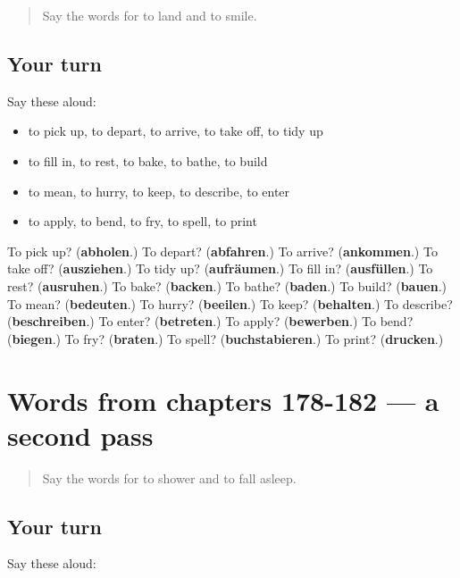 \label{lesson:GE-R182-first-pass-words-from-chapters-174-177}



\begin{quote}
Say the words for to land and to smile.
\end{quote}

\subsection*{Your turn}
Say these aloud:

\begin{itemize}
\raggedright
  \item to pick up, to depart, to arrive, to take off, to tidy up
  \item to fill in, to rest, to bake, to bathe, to build
  \item to mean, to hurry, to keep, to describe, to enter
  \item to apply, to bend, to fry, to spell, to print
\end{itemize}

\begin{tcolorbox}[breakable,colback=teal!4,colframe=teal!35!black,title={Before you move on}]
To pick up? (\textbf{abholen}.) To depart? (\textbf{abfahren}.) To arrive? (\textbf{ankommen}.) To take off? (\textbf{ausziehen}.) To tidy up? (\textbf{aufräumen}.) To fill in? (\textbf{ausfüllen}.) To rest? (\textbf{ausruhen}.) To bake? (\textbf{backen}.) To bathe? (\textbf{baden}.) To build? (\textbf{bauen}.) To mean? (\textbf{bedeuten}.) To hurry? (\textbf{beeilen}.) To keep? (\textbf{behalten}.) To describe? (\textbf{beschreiben}.) To enter? (\textbf{betreten}.) To apply? (\textbf{bewerben}.) To bend? (\textbf{biegen}.) To fry? (\textbf{braten}.) To spell? (\textbf{buchstabieren}.) To print? (\textbf{drucken}.)
\end{tcolorbox}
\section[(dialogue)]{Words from chapters 178-182 — a second pass}

\label{lesson:GE-R182-second-pass-words-from-chapters-178-182}



\begin{quote}
Say the words for to shower and to fall asleep.
\end{quote}

\subsection*{Your turn}
Say these aloud:

